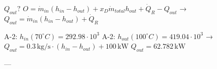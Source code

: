 \( Q_{out}? \)  
\( O = \dot{m}_{in} (h_{in} - h_{out}) + x_{D} \dot{m}_{total} h_{out} + \dot{Q}_{R} - Q_{out} \)  
→ \( Q_{out} = \dot{m}_{in} (h_{in} - h_{out}) + \dot{Q}_{R} \)  

A-2: \( h_{in} (70^\circ C) = 292.98 \cdot 10^3 \)  
A-2: \( h_{out} (100^\circ C) = 419.04 \cdot 10^3 \)  
→ \( Q_{out} = 0.3 \, \text{kg/s} \cdot (h_{in} - h_{out}) + 100 \, \text{kW} \)  
\( Q_{out} = 62.782 \, \text{kW} \)  

---